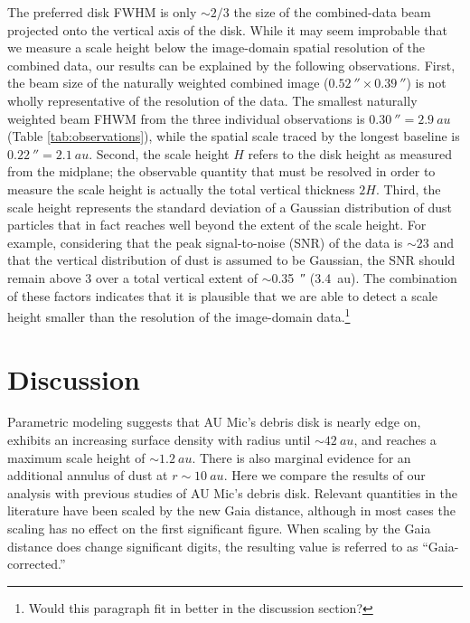 \documentclass[modern]{aastex62}
\begin{document}
The preferred disk FWHM is only $\sim 2/3$ the size of the combined-data beam projected onto the vertical axis of the disk.
While it may seem improbable that we measure a scale height below the image-domain spatial resolution of the combined data, our results can be explained by the following observations.
First, the beam size of the naturally weighted combined image ($\SI{0.52}{\arcsecond} \times \SI{0.39}{\arcsecond}$) is not wholly representative of the resolution of the data. 
The smallest naturally weighted beam FHWM from the three individual observations is $\SI{0.30}{\arcsecond} = \SI{2.9}{au}$ (Table \ref{tab:observations}), while the spatial scale traced by the longest baseline is $\SI{0.22}{\arcsecond} = \SI{2.1}{au}$.
Second, the scale height $H$ refers to the disk height as measured from the midplane; the observable quantity that must be resolved in order to measure the scale height is actually the total vertical thickness $2H$.
Third, the scale height represents the standard deviation of a Gaussian distribution of dust particles that in fact reaches well beyond the extent of the scale height.
For example, considering that the peak signal-to-noise (SNR) of the data is $\sim 23$ and that the vertical distribution of dust is assumed to be Gaussian, the SNR should remain above 3 over a total vertical extent of $\sim$\SI{0.35}{\arcsecond} (\SI{3.4}{au}). 
The combination of these factors indicates that it is plausible that we are able to detect a scale height smaller than the resolution of the image-domain data.\footnote{Would this paragraph fit in better in the discussion section?}


\section{Discussion}
\label{section: discussion}

Parametric modeling suggests that AU Mic's debris disk is nearly edge on, exhibits an increasing surface density with radius until $\sim\SI{42}{au}$, and reaches a maximum scale height of $\sim\SI{1.2}{au}$.
There is also marginal evidence for an additional annulus of dust at $r \sim \SI{10}{au}$.
Here we compare the results of our analysis with previous studies of AU Mic's debris disk.
Relevant quantities in the literature have been scaled by the new Gaia distance, although in most cases the scaling has no effect on the first significant figure.
When scaling by the Gaia distance does change significant digits, the resulting value is referred to as ``Gaia-corrected.''
\end{document}

